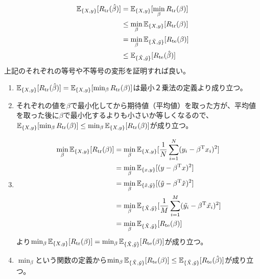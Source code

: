 \documentclass{jsarticle}
\begin{document}
\subsection{}

\subsection{}
\begin{align*}
\mathbb{E}_{\{X,y\}}[R_{\rm tr}(\hat{\beta})]&=\mathbb{E}_{\{X,y\}}[\min_{\beta}R_{\rm tr}(\beta)]\\
&\leq\min_{\beta}\mathbb{E}_{\{X,y\}}[R_{\rm tr}(\beta)]\\
&=\min_{\beta}\mathbb{E}_{\{\tilde{X},\tilde{y}\}}[R_{\rm te}(\beta)]\\
&\leq \mathbb{E}_{\{\tilde{X},\tilde{y}\}}[R_{\rm te}(\hat{\beta})]
\end{align*}
上記のそれぞれの等号や不等号の変形を証明すれば良い。\\
\begin{enumerate}
\item
$\mathbb{E}_{\{X,y\}}[R_{\rm tr}(\hat{\beta})]=\mathbb{E}_{\{X,y\}}[\min_{\beta}R_{\rm tr}(\beta)]$は最小２乗法の定義より成り立つ。
\item
それぞれの値を$\beta$で最小化してから期待値（平均値）を取った方が、平均値を取った後に$\beta$で最小化するよりも小さいか等しくなるので、$\mathbb{E}_{\{X,y\}}[\min_{\beta}R_{\rm tr}(\beta)]\leq\min_{\beta}\mathbb{E}_{\{X,y\}}[R_{\rm tr}(\beta)]$が成り立つ。
\item
\begin{align*}
\min_{\beta}\mathbb{E}_{\{X,y\}}[R_{\rm tr}(\beta)]&=
\min_{\beta}\mathbb{E}_{\{X,y\}}[\frac{1}{N}\sum_{i=1}^{N}(y_i-\beta^{\mathrm{T}}x_i)^2]\\
&=\min_{\beta}\mathbb{E}_{\{x,y\}}[(y-\beta^{\mathrm{T}}x)^2]\\
&=\min_{\beta}\mathbb{E}_{\{\tilde{x},\tilde{y}\}}[(\tilde{y}-\beta^{\mathrm{T}}\tilde{x})^2]\\
&=\min_{\beta}\mathbb{E}_{\{\tilde{X},\tilde{y}\}}[\frac{1}{M}\sum_{i=1}^{M}(\tilde{y_i}-\beta^{\mathrm{T}}\tilde{x_i})^2]\\
&=\min_{\beta}\mathbb{E}_{\{\tilde{X},\tilde{y}\}}[R_{\rm te}(\beta)]
\end{align*}
より$\min_{\beta}\mathbb{E}_{\{X,y\}}[R_{\rm tr}(\beta)]=\min_{\beta}\mathbb{E}_{\{\tilde{X},\tilde{y}\}}[R_{\rm te}(\beta)]$が成り立つ。
\item
$\min_{\beta}$という関数の定義から$\min_{\beta}\mathbb{E}_{\{\tilde{X},\tilde{y}\}}[R_{\rm te}(\beta)]\leq \mathbb{E}_{\{\tilde{X},\tilde{y}\}}[R_{\rm te}(\hat{\beta})]$が成り立つ。
\end{enumerate}
\end{document}
